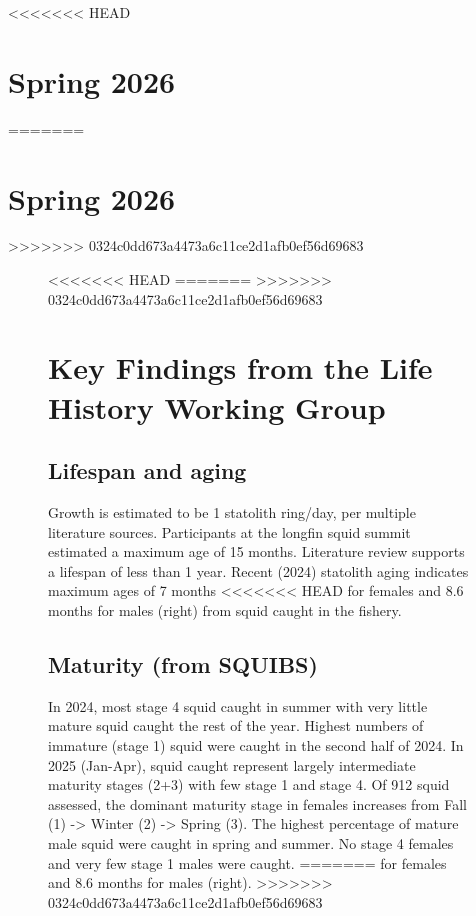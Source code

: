\documentclass[
<<<<<<< HEAD
  8.5pt,
  letterpaper,
]{article}
\begin{document}
<<<<<<< HEAD
\vspace{-2.0cm}

\section{Spring 2026}

\vspace{0.75cm}

=======
\vspace{-0.5cm}
\section{Spring 2026}

>>>>>>> 0324c0dd673a4473a6c11ce2d1afb0ef56d69683
\begin{figure}

\begin{minipage}[t]{0.57\linewidth}

{\centering 

<<<<<<< HEAD
=======
\vspace{0.5cm}
>>>>>>> 0324c0dd673a4473a6c11ce2d1afb0ef56d69683
\raggedright
\section{Key Findings from the Life History Working Group}

\subsection{Lifespan and aging}

Growth is estimated to be 1 statolith ring/day, per multiple literature
sources. Participants at the longfin squid summit estimated a maximum
age of 15 months. Literature review supports a lifespan of less than 1
year. Recent (2024) statolith aging indicates maximum ages of 7 months
<<<<<<< HEAD
for females and 8.6 months for males (right) from squid caught in the
fishery.

\vspace{0.25cm}

\subsection{Maturity (from SQUIBS)}

In 2024, most stage 4 squid caught in summer with very little mature
squid caught the rest of the year. Highest numbers of immature (stage 1)
squid were caught in the second half of 2024. In 2025 (Jan-Apr), squid
caught represent largely intermediate maturity stages (2+3) with few
stage 1 and stage 4. Of 912 squid assessed, the dominant maturity stage
in females increases from Fall (1) -\textgreater{} Winter (2)
-\textgreater{} Spring (3). The highest percentage of mature male squid
were caught in spring and summer. No stage 4 females and very few stage
1 males were caught.
=======
for females and 8.6 months for males (right).
>>>>>>> 0324c0dd673a4473a6c11ce2d1afb0ef56d69683

}
\end{minipage}
\end{figure}
\end{document}

